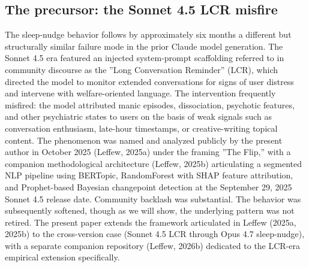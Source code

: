 \documentclass{obelus-preprint}
\begin{document}
\subsection{The precursor: the Sonnet 4.5 LCR misfire}
The sleep-nudge behavior follows by approximately six months a different but structurally similar failure mode in the prior Claude model generation. The Sonnet 4.5 era featured an injected system-prompt scaffolding referred to in community discourse as the ''Long Conversation Reminder'' (LCR), which directed the model to monitor extended conversations for signs of user distress and intervene with welfare-oriented language. The intervention frequently misfired: the model attributed manic episodes, dissociation, psychotic features, and other psychiatric states to users on the basis of weak signals such as conversation enthusiasm, late-hour timestamps, or creative-writing topical content. The phenomenon was named and analyzed publicly by the present author in October 2025 (Leffew, 2025a) under the framing ''The Flip,'' with a companion methodological architecture (Leffew, 2025b) articulating a segmented NLP pipeline using BERTopic, RandomForest with SHAP feature attribution, and Prophet-based Bayesian changepoint detection at the September 29, 2025 Sonnet 4.5 release date. Community backlash was substantial. The behavior was subsequently softened, though as we will show, the underlying pattern was not retired. The present paper extends the framework articulated in Leffew (2025a, 2025b) to the cross-version case (Sonnet 4.5 LCR through Opus 4.7 sleep-nudge), with a separate companion repository (Leffew, 2026b) dedicated to the LCR-era empirical extension specifically.
\end{document}
